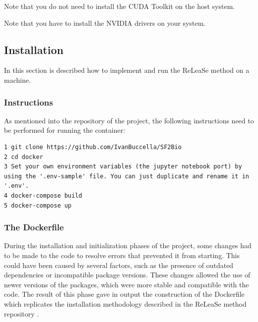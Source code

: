 \documentclass[a4paper]{article}
\begin{document}
\begin{flushleft}
Note that you do not need to install the CUDA Toolkit on the host system.

Note that you have to install the NVIDIA drivers on your system.
\end{flushleft}


\subsection{Installation}\label{sec:Installation}

In this section is described how to implement and run the ReLeaSe method on a machine.

\subsubsection{Instructions}\label{sec:Instructions}

As mentioned into the repository \cite{git-sf2bio} of the project, the following instructions need to be performed for running the container:

\begin{lstlisting}
1 git clone https://github.com/IvanBuccella/SF2Bio
2 cd docker
3 Set your own environment variables (the jupyter notebook port) by using the '.env-sample' file. You can just duplicate and rename it in '.env'.
4 docker-compose build
5 docker-compose up
\end{lstlisting}

\subsubsection{The Dockerfile}\label{sec:The Dockerfile}

During the installation and initialization phases of the project, some changes had to be made to the code to resolve errors that prevented it from starting. This could have been caused by several factors, such as the presence of outdated dependencies or incompatible package versions. These changes allowed the use of newer versions of the packages, which were more stable and compatible with the code. 
The result of this phase gave in output the construction of the Dockerfile which replicates the installation methodology described in the ReLeaSe method repository \cite{git-isayev-release}. 
\end{document}
